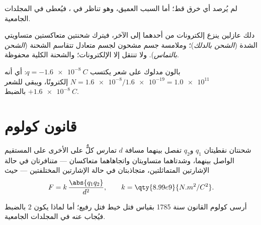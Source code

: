 \begin{remark}\label{rem:g11:fundamental-interactions:conservation}
لم يُرصد أي خرق قط؛ أما السبب العميق، وهو تناظر في
، فيُعطى في المجلدات الجامعية.
\end{remark}

\begin{definition}\label{def:g11:fundamental-interactions:charging}
دلك عازلين ينزع إلكترونات من أحدهما إلى الآخر،
فيترك شحنتين متعاكستين متساويتي الشدة (\emph{الشحن
بالدلك})؛ وملامسة جسم مشحون لجسم
متعادل تتقاسم الشحنة (\emph{الشحن
بالتماس}). ولا تنتقل إلا الإلكترونات؛ والشحنة
الكلية محفوظة.
\end{definition}

\begin{example}[عدّ الإلكترونات]\label{ex:g11:fundamental-interactions:balloon}
بالون مدلوك على شعر يكتسب $q = \qty{-1.6e-8}{C}$: أي أنه
\emph{} $N = \num{1.6e-8} / \num{1.6e-19} = \num{1.0e11}$
إلكترونًا، ويبقى للشعر $+\qty{1.6e-8}{C}$ بالضبط.
\end{example}

\section{قانون كولوم}

\begin{theorem}\label{thm:g11:fundamental-interactions:coulomb}
شحنتان نقطيتان $q_1$ و$q_2$ تفصل بينهما مسافة $d$ تمارس كلٌّ
على الأخرى  على المستقيم الواصل بينهما، وشدتاهما متساويتان
واتجاهاهما متعاكسان --- متنافرتان في حالة الإشارتين المتماثلتين، متجاذبتان في حالة الإشارتين
المختلفتين --- حيث
\[
F = k\,\frac{\abs{q_1 q_2}}{d^{2}},
\qquad k = \qty{8.99e9}{N.m^2/C^2}.
\]
\end{theorem}
\admitted

\begin{remark}\label{rem:g11:fundamental-interactions:torsion}
أرسى كولوم القانون سنة 1785 بقياس فتل خيط فتل رفيع؛ أما لماذا يكون  $2$ بالضبط فيُجاب عنه في المجلدات الجامعية.
\end{remark}

